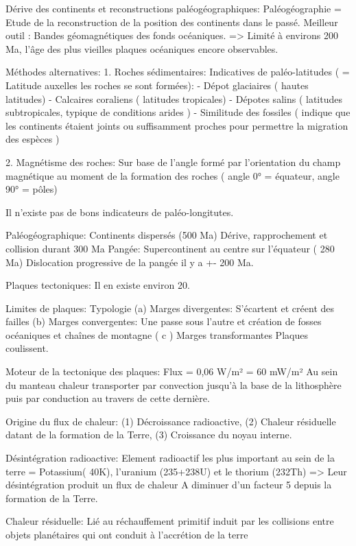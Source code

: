 Dérive des continents et reconstructions paléogéographiques:
Paléogéographie = Etude de la reconstruction de la position des continents dans le passé.
Meilleur outil : Bandes géomagnétiques des fonds océaniques.
        => Limité à environs 200 Ma, l’âge des plus vieilles plaques océaniques encore 
observables.


Méthodes alternatives:
1. Roches sédimentaires:
Indicatives de paléo-latitudes ( = Latitude auxelles les roches se sont formées):
        - Dépot glaciaires ( hautes latitudes)
        - Calcaires coraliens ( latitudes tropicales)
        - Dépotes salins ( latitudes subtropicales, typique de conditions arides )
        - Similitude des fossiles ( indique que les continents étaient joints ou suffisamment 
proches pour permettre la migration des espèces )


2. Magnétisme des roches:
Sur base de l’angle formé par l’orientation du champ magnétique au moment de la formation des roches ( angle 0° = équateur, angle 90° = pôles)




Il n’existe pas de bons indicateurs de paléo-longitutes.


Paléogéographique:
Continents dispersés (500 Ma)
Dérive, rapprochement et collision durant 300 Ma
Pangée: Supercontinent au centre sur l’équateur ( 280 Ma)
Dislocation progressive de la pangée il y a +- 200 Ma.


Plaques tectoniques:
Il en existe environ 20.


Limites de plaques: Typologie
(a) Marges divergentes:
S’écartent et créent des failles
(b) Marges convergentes:
Une passe sous l’autre et création de fosses océaniques et chaînes de montagne
( c ) Marges transformantes
Plaques coulissent.


Moteur de la tectonique des plaques:
Flux = 0,06 W/m² = 60 mW/m²
Au sein du manteau chaleur transporter par convection jusqu’à la base de la lithosphère puis par conduction au travers de cette dernière.


Origine du flux de chaleur: (1) Décroissance radioactive, (2) Chaleur résiduelle datant de la formation de la Terre, (3) Croissance du noyau interne.


Désintégration radioactive:
Element radioactif les plus important au sein de la terre =  Potassium( 40K), l’uranium (235+238U) et le thorium (232Th)
=> Leur désintégration produit un flux de chaleur
A diminuer d’un facteur 5 depuis la formation de la Terre.


Chaleur résiduelle: Lié au réchauffement primitif induit par les collisions entre objets planétaires qui ont conduit à l’accrétion de la terre


